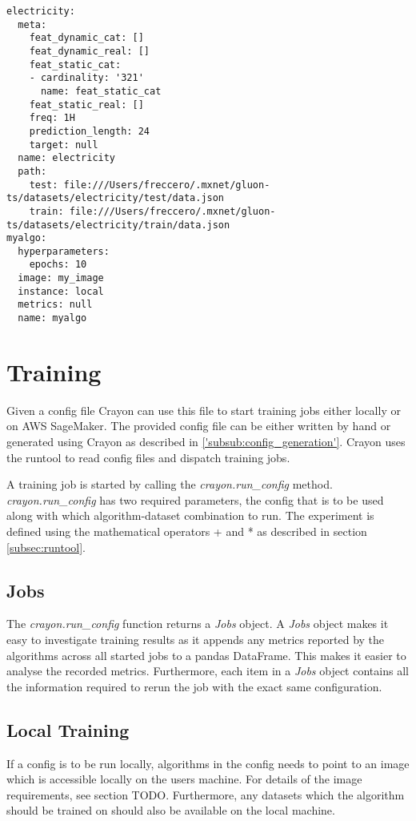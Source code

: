 \begin{lstlisting}[label={output:config_generation_gluonts}, caption=Output of \ref{code:config_generation_gluonts}]
electricity:
  meta:
    feat_dynamic_cat: []
    feat_dynamic_real: []
    feat_static_cat:
    - cardinality: '321'
      name: feat_static_cat
    feat_static_real: []
    freq: 1H
    prediction_length: 24
    target: null
  name: electricity
  path:
    test: file:///Users/freccero/.mxnet/gluon-ts/datasets/electricity/test/data.json
    train: file:///Users/freccero/.mxnet/gluon-ts/datasets/electricity/train/data.json
myalgo:
  hyperparameters:
    epochs: 10
  image: my_image
  instance: local
  metrics: null
  name: myalgo
\end{lstlisting}

\section{Training}
Given a config file Crayon can use this file to start training jobs either locally or on AWS SageMaker. The provided config file can be either written by hand or generated using Crayon as described in \ref{'subsub:config_generation'}. Crayon uses the runtool to read config files and dispatch training jobs.

A training job is started by calling the \textit{crayon.run\_config} method.  \textit{crayon.run\_config} has two required parameters, the config that is to be used along with which algorithm-dataset combination to run. The experiment is defined using the mathematical operators + and * as described in section \ref{subsec:runtool}.

\subsection{Jobs}
\label{subsubsec:jobs}
The \textit{crayon.run\_config} function returns a \textit{Jobs} object. A \textit{Jobs} object makes it easy to investigate training results as it appends any metrics reported by the algorithms across all started jobs to a pandas DataFrame. This makes it easier to analyse the recorded metrics. Furthermore, each item in a \textit{Jobs} object contains all the information required to rerun the job with the exact same configuration.

\subsection{Local Training}
If a config is to be run locally, algorithms in the config needs to point to an image which is accessible locally on the users machine. For details of the image requirements, see section TODO. Furthermore, any datasets which the algorithm should be trained on should also be available on the local machine.

